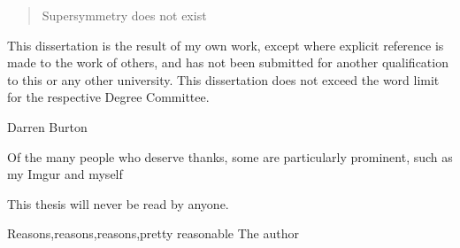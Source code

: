 
\begin{abstract}%
  Supersymmetry does not exist
  \end{abstract}


\begin{declaration}
  This dissertation is the result of my own work, except where explicit
  reference is made to the work of others, and has not been submitted
  for another qualification to this or any other university. This
  dissertation does not exceed the word limit for the respective Degree
  Committee.
  \vspace*{1cm}
  \begin{flushright}
    Darren Burton
  \end{flushright}
\end{declaration}


\begin{acknowledgements}
  Of the many people who deserve thanks, some are particularly prominent,
  such as my Imgur and myself
\end{acknowledgements}


\begin{preface}
  This thesis will never be read by anyone. 

  \noindent
  
\end{preface}

\tableofcontents

\frontquote%
  {Reasons,reasons,reasons,pretty reasonable}%
  {The author}
